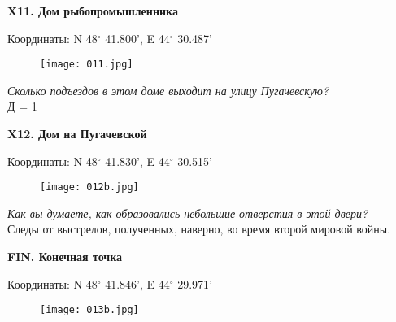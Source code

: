 \documentclass[pscyr]{hedwork}
\begin{document}
  \pagebreak

  \textbf{X11. Дом рыбопромышленника}

  Координаты: N 48\( ^\circ \) 41.800', E 44\( ^\circ \) 30.487'

  \begin{figure}[htbp]
    \center
    \texttt{[image: 011.jpg]}
  \end{figure}

  \emph{Сколько подъездов в этом доме выходит на улицу Пугачевскую?} \\
  Д = 1

  \pagebreak

  \textbf{X12. Дом на Пугачевской}

  Координаты: N 48\( ^\circ \) 41.830', E 44\( ^\circ \) 30.515'

  \begin{figure}[htbp]
    \center
    \texttt{[image: 012b.jpg]}
  \end{figure}
  
  \emph{Как вы думаете, как образовались небольшие отверстия в этой двери?} \\
  Следы от выстрелов, полученных, наверно, во время второй мировой войны.
  \pagebreak

  \textbf{FIN. Конечная точка}

  Координаты: N 48\( ^\circ \) 41.846', E 44\( ^\circ \) 29.971'

  \begin{figure}[htbp]
    \center
    \texttt{[image: 013b.jpg]}
  \end{figure}
  
  \pagebreak
  
\end{document}
